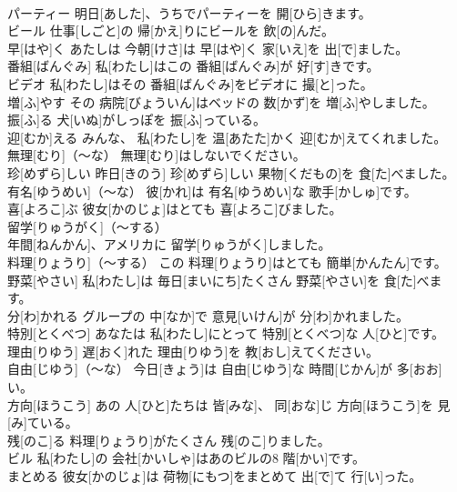 \documentclass[8pt]{extreport}
\begin{document}
\begin{CJK}{UTF8}{min}
\\	パーティー	明日[あした]、うちでパーティーを 開[ひら]きます。		
\\	ビール	仕事[しごと]の 帰[かえ]りにビールを 飲[の]んだ。		
\\	早[はや]く	あたしは 今朝[けさ]は 早[はや]く 家[いえ]を 出[で]ました。		
\\	番組[ばんぐみ]	私[わたし]はこの 番組[ばんぐみ]が 好[す]きです。		
\\	ビデオ	私[わたし]はその 番組[ばんぐみ]をビデオに 撮[と]った。		
\\	増[ふ]やす	その 病院[びょういん]はベッドの 数[かず]を 増[ふ]やしました。		
\\	振[ふ]る	犬[いぬ]がしっぽを 振[ふ]っている。		
\\	迎[むか]える	みんな、 私[わたし]を 温[あたた]かく 迎[むか]えてくれました。		
\\	無理[むり]（～な）	無理[むり]はしないでください。		
\\	珍[めずら]しい	昨日[きのう] 珍[めずら]しい 果物[くだもの]を 食[た]べました。		
\\	有名[ゆうめい]（～な）	彼[かれ]は 有名[ゆうめい]な 歌手[かしゅ]です。		
\\	喜[よろこ]ぶ	彼女[かのじょ]はとても 喜[よろこ]びました。		
\\	留学[りゅうがく]（～する）	
\\	年間[ねんかん]、アメリカに 留学[りゅうがく]しました。		
\\	料理[りょうり]（～する）	この 料理[りょうり]はとても 簡単[かんたん]です。		
\\	野菜[やさい]	私[わたし]は 毎日[まいにち]たくさん 野菜[やさい]を 食[た]べます。		
\\	分[わ]かれる	グループの 中[なか]で 意見[いけん]が 分[わ]かれました。		
\\	特別[とくべつ]	あなたは 私[わたし]にとって 特別[とくべつ]な 人[ひと]です。		
\\	理由[りゆう]	遅[おく]れた 理由[りゆう]を 教[おし]えてください。		
\\	自由[じゆう]（～な）	今日[きょう]は 自由[じゆう]な 時間[じかん]が 多[おお]い。		
\\	方向[ほうこう]	あの 人[ひと]たちは 皆[みな]、 同[おな]じ 方向[ほうこう]を 見[み]ている。		
\\	残[のこ]る	料理[りょうり]がたくさん 残[のこ]りました。		
\\	ビル	私[わたし]の 会社[かいしゃ]はあのビルの8 階[かい]です。		
\\	まとめる	彼女[かのじょ]は 荷物[にもつ]をまとめて 出[で]て 行[い]った。		

\end{CJK}
\end{document}
